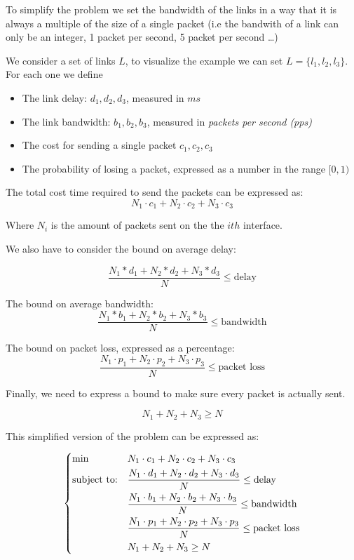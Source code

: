 	To simplify the problem we set the bandwidth of the links in a way that it is always a multiple of the size of a single packet (i.e the bandwith of a link can only be an integer, 1 packet per second, 5 packet per second \dots)
	
	
	We consider a set of links $L$, to visualize the example we can set  $L = \{l_1, l_2, l_3 \}$. \\
	
	For each one we define
	\begin{itemize}
		\item The link delay:  $d_1, d_2, d_3$, measured in $ms$
		\item The link bandwidth: $b_1, b_2, b_3$, measured in \textit{packets per second (pps)}
		\item The cost for sending a single packet $c_1, c_2, c_3$
		\item The probability of losing a packet, expressed as a number in the range $ [0, 1)$
	\end{itemize}
	
	The total cost time required to send the packets can be expressed as:
	\[
	N_1 \cdot c_1 +
	N_2 \cdot c_2 +
	N_3 \cdot c_3 
	\]
	
	Where $N_i$ is the amount of packets sent on the the $ith$ interface.
	
	We also have to consider the bound on average delay:
	
	\[
	\frac
	{N_1 * d_1 + N_2 * d_2  + N_3 * d_3 }
	{N}
	\le \text{delay}
	\]
	
	The bound on average bandwidth:
	\[
	\frac
	{N_1 * b_1 + N_2 * b_2  + N_3 * b_3 }
	{N}
	\le \text{bandwidth}
	\]
	
	The bound on packet loss, expressed as a percentage:
	\[
	\frac
	{N_1 \cdot p_1 + N_2 \cdot p_2 + N_3 \cdot p_3 }
	{N}
	\le \text{packet loss}
	\]
	
	Finally, we need to express a bound to make sure every packet is actually sent.
	
	\[
	N_1 + N_2 + N_3 \ge N
	\]
	
	This simplified version of the problem can be expressed as: 
	
	\begin{equation}\label{eq:linear_formulation_final}
		\begin{dcases}
			\begin{aligned}
				& {\text{min}}
				& & N_1 \cdot c_1 + N_2 \cdot c_2 +	N_3 \cdot c_3 \\
				& \text{subject to:}
				& & \frac
				{N_1 \cdot d_1 + N_2 \cdot d_2  + N_3 \cdot d_3 }
				{N}
				\le \text{delay} \\
				& & & \frac
				{N_1 \cdot b_1 + N_2 \cdot b_2  + N_3 \cdot b_3 }
				{N}
				\le \text{bandwidth} \\
				& & & \frac
				{N_1 \cdot p_1 + N_2 \cdot p_2 + N_3 \cdot p_3 }
				{N}
				\le \text{packet loss} \\
				& & &
				N_1 + N_2 + N_3 \ge N
			\end{aligned}
		\end{dcases}
	\end{equation}
	
